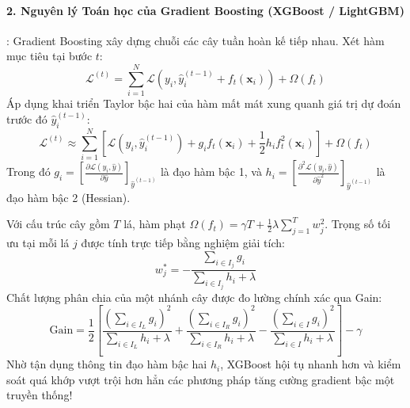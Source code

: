 \paragraph{2. Nguyên lý Toán học của Gradient Boosting (XGBoost / LightGBM)}:
Gradient Boosting xây dựng chuỗi các cây tuần hoàn kế tiếp nhau. Xét hàm mục tiêu tại bước $t$:
\begin{equation}
\mathcal{L}^{(t)} = \sum_{i=1}^N \mathcal{L}(y_i, \hat{y}_i^{(t-1)} + f_t(\mathbf{x}_i)) + \Omega(f_t)
\end{equation}
Áp dụng khai triển Taylor bậc hai của hàm mất mát xung quanh giá trị dự đoán trước đó $\hat{y}_i^{(t-1)}$:
\begin{equation}
\mathcal{L}^{(t)} \approx \sum_{i=1}^N \left[ \mathcal{L}(y_i, \hat{y}_i^{(t-1)}) + g_i f_t(\mathbf{x}_i) + \frac{1}{2} h_i f_t^2(\mathbf{x}_i) \right] + \Omega(f_t)
\end{equation}
Trong đó $g_i = \left[\frac{\partial \mathcal{L}(y_i, \hat{y})}{\partial \hat{y}}\right]_{\hat{y}^{(t-1)}}$ là đạo hàm bậc 1, và $h_i = \left[\frac{\partial^2 \mathcal{L}(y_i, \hat{y})}{\partial \hat{y}^2}\right]_{\hat{y}^{(t-1)}}$ là đạo hàm bậc 2 (Hessian).

Với cấu trúc cây gồm $T$ lá, hàm phạt $\Omega(f_t) = \gamma T + \frac{1}{2} \lambda \sum_{j=1}^T w_j^2$. Trọng số tối ưu tại mỗi lá $j$ được tính trực tiếp bằng nghiệm giải tích:
\begin{equation}
w_j^* = -\frac{\sum_{i \in I_j} g_i}{\sum_{i \in I_j} h_i + \lambda}
\label{eq:xgboost-leaf-weight}
\end{equation}
Chất lượng phân chia của một nhánh cây được đo lường chính xác qua Gain:
\begin{equation}
\text{Gain} = \frac{1}{2} \left[ \frac{\left(\sum_{i \in I_L} g_i\right)^2}{\sum_{i \in I_L} h_i + \lambda} + \frac{\left(\sum_{i \in I_R} g_i\right)^2}{\sum_{i \in I_R} h_i + \lambda} - \frac{\left(\sum_{i \in I} g_i\right)^2}{\sum_{i \in I} h_i + \lambda} \right] - \gamma
\end{equation}
Nhờ tận dụng thông tin đạo hàm bậc hai $h_i$, XGBoost hội tụ nhanh hơn và kiểm soát quá khớp vượt trội hơn hẳn các phương pháp tăng cường gradient bậc một truyền thống!

